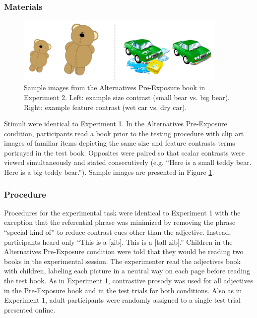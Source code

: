 \documentclass[man]{apa2}
\begin{document}
\subsubsection{Materials}

\begin{figure}[t] 
  \begin{center} 
    \includegraphics[width=4in]{figures/aliens_book_demo_mod.png} 
    \caption{\label{fig:book_demo} Sample images from the Alternatives Pre-Exposure book in Experiment 2. Left: example size contrast (small bear vs. big bear). Right: example feature contrast (wet car vs. dry car).}
  \end{center} 
\vspace{-10ex}
\end{figure}

Stimuli were identical to Experiment 1. In the Alternatives Pre-Exposure condition, participants read a book prior to the testing procedure with clip art images of familiar items depicting the same size and feature contrasts terms portrayed in the test book. Opposites were paired so that scalar contrasts were viewed simultaneously and stated consecutively (e.g. ``Here is a small teddy bear. Here is a big teddy bear.'').  Sample images are presented in Figure \ref{fig:book_demo}.


\subsubsection{Procedure}

Procedures for the experimental task were identical to Experiment 1 with the exception that the referential phrase was minimized by removing the phrase ``special kind of'' to reduce contrast cues other than the adjective.  Instead, participants heard only ``This is a [zib]. This is a [tall zib].''  Children in the Alternatives Pre-Exposure condition were told that they would be reading two books in the experimental session. The experimenter read the adjectives book with children, labeling each picture in a neutral way on each page before reading the test book. As in Experiment 1, contrastive prosody was used for all adjectives in the Pre-Exposure book and in the test trials for both conditions. Also as in Experiment 1, adult participants were randomly assigned to a single test trial presented online.  
\end{document}
